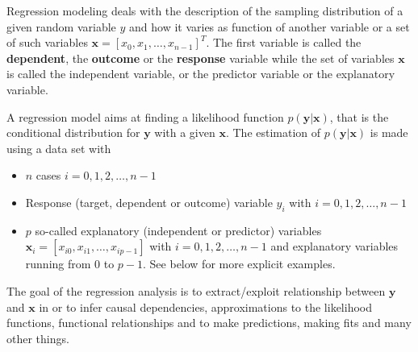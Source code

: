 \documentclass[%
oneside,                 %
final,                   %
10pt]{article}
\newenvironment{block_mdfboxadmon}[1][]{
\begin{block_mdfboxmdframed}[frametitle=#1]
}
{
\end{block_mdfboxmdframed}
}
\begin{document}
\begin{block_mdfboxadmon}[]

Regression modeling deals with the description of  the sampling distribution of a given random variable $y$ and how it varies as function of another variable or a set of such variables $\bm{x} =[x_0, x_1,\dots, x_{n-1}]^T$. 
The first variable is called the \textbf{dependent}, the \textbf{outcome} or the \textbf{response} variable while the set of variables $\bm{x}$ is called the independent variable, or the predictor variable or the explanatory variable. 

A regression model aims at finding a likelihood function $p(\bm{y}\vert \bm{x})$, that is the conditional distribution for $\bm{y}$ with a given $\bm{x}$. The estimation of  $p(\bm{y}\vert \bm{x})$ is made using a data set with 
\begin{itemize}
\item $n$ cases $i = 0, 1, 2, \dots, n-1$ 

\item Response (target, dependent or outcome) variable $y_i$ with $i = 0, 1, 2, \dots, n-1$ 

\item $p$ so-called explanatory (independent or predictor) variables $\bm{x}_i=[x_{i0}, x_{i1}, \dots, x_{ip-1}]$ with $i = 0, 1, 2, \dots, n-1$ and explanatory variables running from $0$ to $p-1$. See below for more explicit examples.   
\end{itemize}

\noindent
 The goal of the regression analysis is to extract/exploit relationship between $\bm{y}$ and $\bm{x}$ in or to infer causal dependencies, approximations to the likelihood functions, functional relationships and to make predictions, making fits and many other things.
\end{block_mdfboxadmon} %



\end{document}
